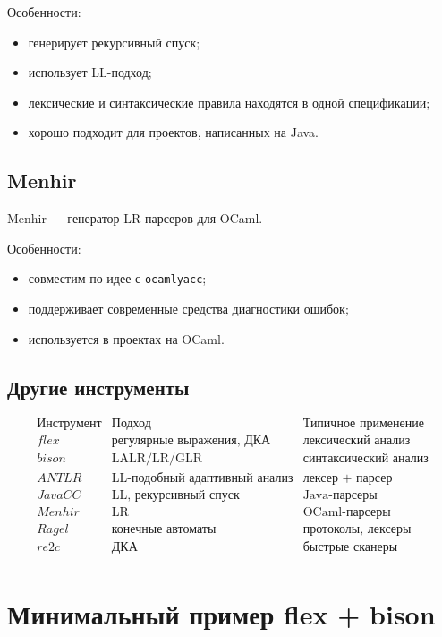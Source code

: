 \documentclass[12pt,a4paper]{article}
\begin{document}
Особенности:
\begin{itemize}
    \item генерирует рекурсивный спуск;
    \item использует LL-подход;
    \item лексические и синтаксические правила находятся в одной спецификации;
    \item хорошо подходит для проектов, написанных на Java.
\end{itemize}

\subsection{Menhir}

Menhir --- генератор LR-парсеров для OCaml.

Особенности:
\begin{itemize}
    \item совместим по идее с \texttt{ocamlyacc};
    \item поддерживает современные средства диагностики ошибок;
    \item используется в проектах на OCaml.
\end{itemize}

\subsection{Другие инструменты}

\[
\begin{array}{c|c|c}
\text{Инструмент} & \text{Подход} & \text{Типичное применение}\\
\hline
flex & \text{регулярные выражения, ДКА} & \text{лексический анализ}\\
bison & \text{LALR/LR/GLR} & \text{синтаксический анализ}\\
ANTLR & \text{LL-подобный адаптивный анализ} & \text{лексер + парсер}\\
JavaCC & \text{LL, рекурсивный спуск} & \text{Java-парсеры}\\
Menhir & \text{LR} & \text{OCaml-парсеры}\\
Ragel & \text{конечные автоматы} & \text{протоколы, лексеры}\\
re2c & \text{ДКА} & \text{быстрые сканеры}\\
\end{array}
\]

\section{Минимальный пример flex + bison}
\end{document}
